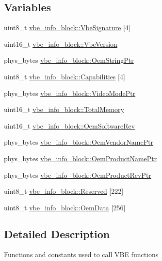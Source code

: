 \subsection*{Variables}
\begin{DoxyCompactItemize}
\item 
uint8\+\_\+t \mbox{\hyperlink{group__vbe_ga06462d45a1a8ae45848b80cfa79444e8}{vbe\+\_\+info\+\_\+block\+::\+Vbe\+Signature}} \mbox{[}4\mbox{]}
\item 
uint16\+\_\+t \mbox{\hyperlink{group__vbe_gac7ab6c25271740667c6b14060618a3a6}{vbe\+\_\+info\+\_\+block\+::\+Vbe\+Version}}
\item 
phys\+\_\+bytes \mbox{\hyperlink{group__vbe_ga008fdeb52dea044bfddb0b77782aa45a}{vbe\+\_\+info\+\_\+block\+::\+Oem\+String\+Ptr}}
\item 
uint8\+\_\+t \mbox{\hyperlink{group__vbe_ga8b92a8e70de3ebac61f917778f3adca0}{vbe\+\_\+info\+\_\+block\+::\+Capabilities}} \mbox{[}4\mbox{]}
\item 
phys\+\_\+bytes \mbox{\hyperlink{group__vbe_gacd86a705c3f231d14694c29ca1794a90}{vbe\+\_\+info\+\_\+block\+::\+Video\+Mode\+Ptr}}
\item 
uint16\+\_\+t \mbox{\hyperlink{group__vbe_gab9cb5bcdc2958a986da30ba36b3be543}{vbe\+\_\+info\+\_\+block\+::\+Total\+Memory}}
\item 
uint16\+\_\+t \mbox{\hyperlink{group__vbe_ga2b59b9d6910c14c6293fbffbcf42523e}{vbe\+\_\+info\+\_\+block\+::\+Oem\+Software\+Rev}}
\item 
phys\+\_\+bytes \mbox{\hyperlink{group__vbe_gadc4a5de56bd1495087eaacb225260a52}{vbe\+\_\+info\+\_\+block\+::\+Oem\+Vendor\+Name\+Ptr}}
\item 
phys\+\_\+bytes \mbox{\hyperlink{group__vbe_gaca54b199c36b08ab53e0e919b00c68cd}{vbe\+\_\+info\+\_\+block\+::\+Oem\+Product\+Name\+Ptr}}
\item 
phys\+\_\+bytes \mbox{\hyperlink{group__vbe_ga77a46bfc82287324433f2bd8d17dd938}{vbe\+\_\+info\+\_\+block\+::\+Oem\+Product\+Rev\+Ptr}}
\item 
uint8\+\_\+t \mbox{\hyperlink{group__vbe_ga8e317dcd4697215e49f95fca709bc05e}{vbe\+\_\+info\+\_\+block\+::\+Reserved}} \mbox{[}222\mbox{]}
\item 
uint8\+\_\+t \mbox{\hyperlink{group__vbe_gabac031f88530417c8ccd8247159490dc}{vbe\+\_\+info\+\_\+block\+::\+Oem\+Data}} \mbox{[}256\mbox{]}
\end{DoxyCompactItemize}


\subsection{Detailed Description}
Functions and constants used to call V\+BE functions 

